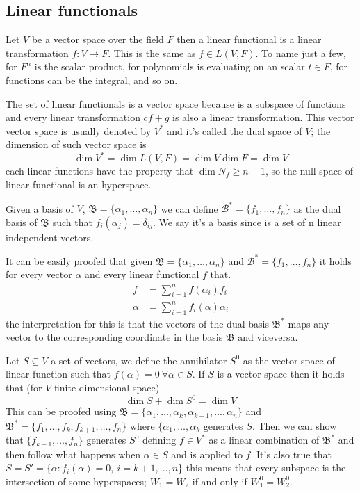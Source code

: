\documentclass[../main.tex]{subfiles}
\begin{document}
\subsection{Linear functionals}
Let $V$ be a vector space over the field $F$ then a linear functional is a linear transformation $f:V\mapsto F$. This is the same as $f\in L(V,F)$. To name just a few, for $F^n$ is the scalar product, for polynomials is evaluating on an scalar $t\in F$, for functions can be the integral, and so on. 

The set of linear functionals is a vector space because is a subspace of functions and every linear transformation $cf+g$ is also a linear transformation. This vector vector space is usually denoted by $V^*$ and it's called the dual space of $V$; the dimension of such vector space is 
\begin{equation*}
    \dim V^* = \dim L(V,F)=\dim V \dim F =\dim V
\end{equation*}
each linear functions have the property that $\dim N_f\ge n-1$, so the null space of linear functional is an hyperspace.

Given a basis of $V$, $\mathfrak{B}=\{\alpha_1,\dots,\alpha_n\}$ we can define $\mathcal{B}^*=\{f_1,\dots,f_n\}$ as the dual basis of $\mathfrak{B}$ such that $f_i(\alpha_j)=\delta_{ij}$. We say it's a basis since is a set of n linear independent vectors.

It can be easily proofed that given $\mathfrak{B}=\{\alpha_1,\dots,\alpha_n\}$ and $\mathcal{B}^*=\{f_1,\dots,f_n\}$ it holds for every vector $\alpha$ and every linear functional $f$ that.
\begin{align*}
    f &= \sum_{i=1}^n f(\alpha_i)f_i\\
    \alpha &= \sum_{i=1}^n f_i(\alpha)\alpha_i
\end{align*}
the interpretation for this is that the vectors of the dual basis $\mathfrak{B}^*$ maps any vector to the corresponding coordinate in the basis $\mathfrak{B}$ and viceversa.

Let $S\subseteq V$ a set of vectors, we define the annihilator $S^0$ as the vector space of linear function such that $f(\alpha)=0\ \forall \alpha\in S$. If $S$ is a vector space then it holds that (for $V$ finite dimensional space)
\begin{equation*}
    \dim S + \dim S^0 = \dim V
\end{equation*}
This can be proofed using $\mathfrak{B}=\{\alpha_1,\dots,\alpha_k,\alpha_{k+1},\dots,\alpha_n\}$ and $\mathfrak{B}^*=\{f_1,\dots,f_k,f_{k+1},\dots,f_n\}$ where $\{\alpha_1,\dots,\alpha_k$ generates $S$. Then we can show that  $\{f_{k+1},\dots,f_n\}$ generates $S^0$ defining $f\in V^*$ as a linear combination of $\mathfrak{B}^*$ and then follow what happens when $\alpha\in S$ and is applied to $f$. It's also true that $S = S' = \{\alpha:f_i(\alpha)=0,\ i=k+1,\dots,n \}$ this means that every subspace is the intersection of some hyperspaces; $W_1=W_2$ if and only if $W_1^0=W_2^0$.
\end{document}
